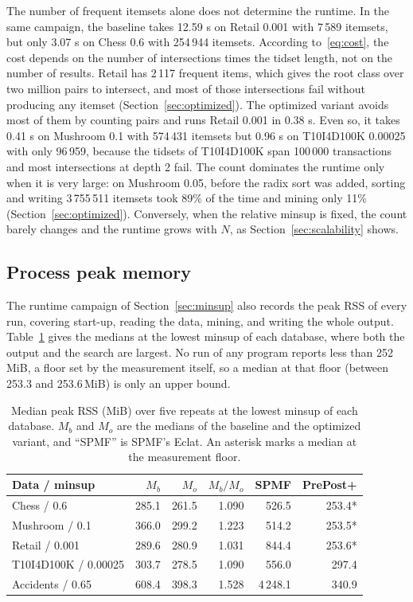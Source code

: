 The number of frequent itemsets alone does not determine the runtime. In the same
campaign, the baseline takes 12.59 s on Retail 0.001 with 7\,589 itemsets, but only
3.07 s on Chess 0.6 with 254\,944 itemsets. According to~\eqref{eq:cost}, the cost depends
on the number of intersections times the tidset length, not on the number of results.
Retail has 2\,117 frequent items, which gives the root class over two million pairs to
intersect, and most of those intersections fail without producing any itemset
(Section~\ref{sec:optimized}). The optimized variant avoids most of them by counting
pairs and runs Retail 0.001 in 0.38 s. Even so, it takes 0.41 s on Mushroom 0.1 with
574\,431 itemsets but 0.96 s on T10I4D100K 0.00025 with only 96\,959, because the tidsets
of T10I4D100K span 100\,000 transactions and most intersections at depth 2 fail. The
count dominates the runtime only when it is very large: on Mushroom 0.05, before the
radix sort was added, sorting and writing 3\,755\,511 itemsets took 89\% of the time and
mining only 11\% (Section~\ref{sec:optimized}). Conversely, when the relative minsup is
fixed, the count barely changes and the runtime grows with $N$, as
Section~\ref{sec:scalability} shows.

\subsection{Process peak memory}
\label{sec:memory}
The runtime campaign of Section~\ref{sec:minsup} also records the peak RSS of every run,
covering start-up, reading the data, mining, and writing the whole output.
Table~\ref{tab:peak-rss} gives the medians at the lowest minsup of each database, where
both the output and the search are largest. No run of any program reports less than
252\,MiB, a floor set by the measurement itself, so a median at that floor (between 253.3
and 253.6\,MiB) is only an upper bound.

\begin{table}[t]
\centering
\small
\setlength{\tabcolsep}{3pt}
\caption{Median peak RSS (MiB) over five repeats at the lowest minsup of each database.
$M_b$ and $M_o$ are the medians of the baseline and the optimized variant, and ``SPMF'' is
SPMF's Eclat. An asterisk marks a median at the measurement floor.}
\label{tab:peak-rss}
\begin{tabular}{lrrrrr}
\hline
Data / minsup & $M_b$ & $M_o$ & $M_b/M_o$ & SPMF & PrePost+ \\
\hline
Chess / 0.6 & 285.1 & 261.5 & 1.090 & 526.5 & 253.4* \\
Mushroom / 0.1 & 366.0 & 299.2 & 1.223 & 514.2 & 253.5* \\
Retail / 0.001 & 289.6 & 280.9 & 1.031 & 844.4 & 253.6* \\
T10I4D100K / 0.00025 & 303.7 & 278.5 & 1.090 & 556.0 & 297.4 \\
Accidents / 0.65 & 608.4 & 398.3 & 1.528 & 4\,248.1 & 340.9 \\
\hline
\end{tabular}
\end{table}

